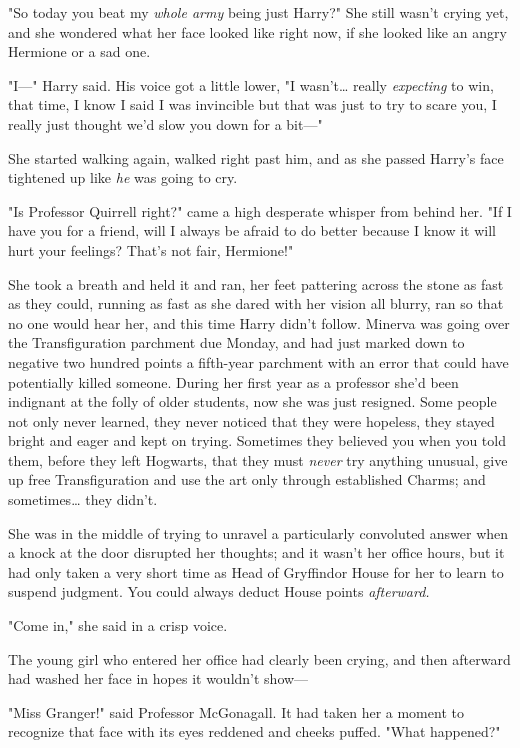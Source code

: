 "So today you beat my \emph{whole army} being just Harry?" She still wasn't
crying yet, and she wondered what her face looked like right now, if she looked
like an angry Hermione or a sad one.

"I---" Harry said. His voice got a little lower, "I wasn't{\ldots} really
\emph{expecting} to win, that time, I know I said I was invincible but that was
just to try to scare you, I really just thought we'd slow you down for a bit---"

She started walking again, walked right past him, and as she passed Harry's
face tightened up like \emph{he} was going to cry.

"Is Professor Quirrell right?" came a high desperate whisper from behind her.
"If I have you for a friend, will I always be afraid to do better because I
know it will hurt your feelings? That's not fair, Hermione!"

She took a breath and held it and ran, her feet pattering across the stone as
fast as they could, running as fast as she dared with her vision all blurry,
ran so that no one would hear her, and this time Harry didn't follow.
\later
Minerva was going over the Transfiguration parchment due Monday, and had just
marked down to negative two hundred points a fifth-year parchment with an error
that could have potentially killed someone. During her first year as a
professor she'd been indignant at the folly of older students, now she was just
resigned. Some people not only never learned, they never noticed that they were
hopeless, they stayed bright and eager and kept on trying. Sometimes they
believed you when you told them, before they left Hogwarts, that they must
\emph{never} try anything unusual, give up free Transfiguration and use the art
only through established Charms; and sometimes{\ldots} they didn't.

She was in the middle of trying to unravel a particularly convoluted answer
when a knock at the door disrupted her thoughts; and it wasn't her office
hours, but it had only taken a very short time as Head of Gryffindor House for
her to learn to suspend judgment. You could always deduct House points
\emph{afterward.}

"Come in," she said in a crisp voice.

The young girl who entered her office had clearly been crying, and then
afterward had washed her face in hopes it wouldn't show---

"Miss Granger!" said Professor McGonagall. It had taken her a moment to
recognize that face with its eyes reddened and cheeks puffed. "What happened?"

